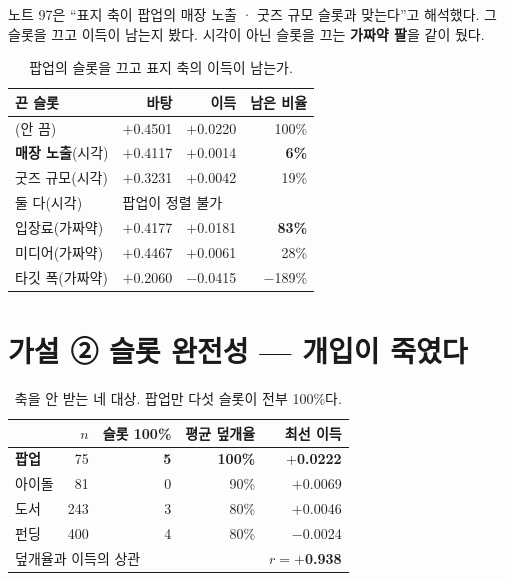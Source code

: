 \documentclass[10pt]{article}
\begin{document}
노트 97은 ``표지 축이 팝업의 매장 노출 · 굿즈 규모 슬롯과 맞는다''고 해석했다.
그 슬롯을 끄고 이득이 남는지 봤다. 시각이 아닌 슬롯을 끄는 \textbf{가짜약 팔}을
같이 뒀다.

\begin{table}[t]
\centering\tsize
\caption{팝업의 슬롯을 끄고 표지 축의 이득이 남는가.}
\begin{tabular}{lrrr}
\toprule
끈 슬롯 & 바탕 & 이득 & 남은 비율 \\
\midrule
(안 끔) & $+$0.4501 & $+$0.0220 & 100\% \\
\midrule
\textbf{매장 노출}(시각) & $+$0.4117 & $+$0.0014 & \textbf{6\%} \\
굿즈 규모(시각) & $+$0.3231 & $+$0.0042 & 19\% \\
둘 다(시각) & \multicolumn{3}{l}{팝업이 정렬 불가} \\
\midrule
입장료(가짜약) & $+$0.4177 & $+$0.0181 & \textbf{83\%} \\
미디어(가짜약) & $+$0.4467 & $+$0.0061 & 28\% \\
타깃 폭(가짜약) & $+$0.2060 & $-$0.0415 & $-$189\% \\
\bottomrule
\end{tabular}
\end{table}


\section{가설 ② 슬롯 완전성 --- 개입이 죽였다}

\begin{table}[t]
\centering\tsize
\caption{축을 안 받는 네 대상. 팝업만 다섯 슬롯이 전부 100\%다.}
\begin{tabular}{lrrrr}
\toprule
& $n$ & 슬롯 100\% & 평균 덮개율 & 최선 이득 \\
\midrule
\textbf{팝업} & 75 & \textbf{5} & \textbf{100\%} & \textbf{$+$0.0222} \\
아이돌 & 81 & 0 & 90\% & $+$0.0069 \\
도서 & 243 & 3 & 80\% & $+$0.0046 \\
펀딩 & 400 & 4 & 80\% & $-$0.0024 \\
\midrule
\multicolumn{3}{l}{덮개율과 이득의 상관} & & \textbf{$r=+$0.938} \\
\bottomrule
\end{tabular}
\end{table}
\end{document}
